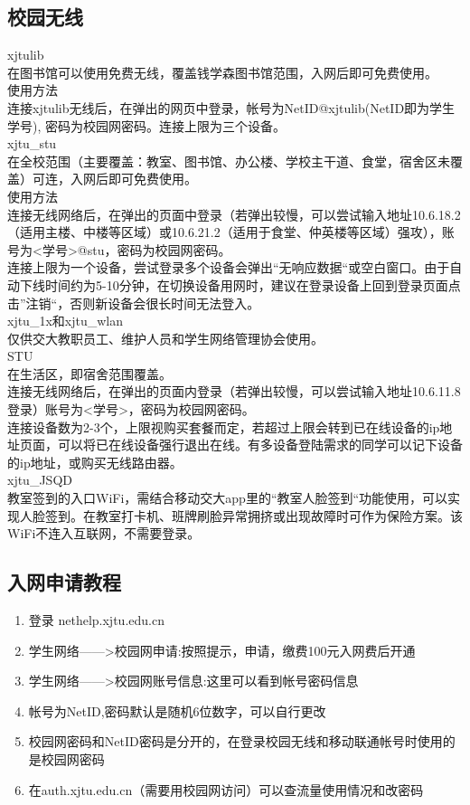 \documentclass[
decoration,  %
]{qyxf-book}
\begin{document}
\subsection{校园无线}
\noindent xjtulib\\
在图书馆可以使用免费无线，覆盖钱学森图书馆范围，入网后即可免费使用。\\
使用方法\\
连接xjtulib无线后，在弹出的网页中登录，帐号为NetID@xjtulib(NetID即为学生学号), 密码为校园网密码。连接上限为三个设备。\\
xjtu\_stu\\
在全校范围（主要覆盖：教室、图书馆、办公楼、学校主干道、食堂，宿舍区未覆盖）可连，入网后即可免费使用。\\
使用方法\\
连接无线网络后，在弹出的页面中登录（若弹出较慢，可以尝试输入地址10.6.18.2（适用主楼、中楼等区域）或10.6.21.2（适用于食堂、仲英楼等区域）强攻），账号为<学号>@stu，密码为校园网密码。\\
连接上限为一个设备，尝试登录多个设备会弹出“无响应数据“或空白窗口。由于自动下线时间约为5-10分钟，在切换设备用网时，建议在登录设备上回到登录页面点击”注销“，否则新设备会很长时间无法登入。\\
xjtu\_1x和xjtu\_wlan\\
仅供交大教职员工、维护人员和学生网络管理协会使用。\\
STU\\
在生活区，即宿舍范围覆盖。\\
连接无线网络后，在弹出的页面内登录（若弹出较慢，可以尝试输入地址10.6.11.8登录）账号为<学号>，密码为校园网密码。\\
连接设备数为2-3个，上限视购买套餐而定，若超过上限会转到已在线设备的ip地址页面，可以将已在线设备强行退出在线。有多设备登陆需求的同学可以记下设备的ip地址，或购买无线路由器。\\
xjtu\_JSQD\\
教室签到的入口WiFi，需结合移动交大app里的“教室人脸签到“功能使用，可以实现人脸签到。在教室打卡机、班牌刷脸异常拥挤或出现故障时可作为保险方案。该WiFi不连入互联网，不需要登录。\\


\subsection{入网申请教程}
\begin{enumerate}
	\item 登录 nethelp.xjtu.edu.cn
	\item 学生网络——>校园网申请:按照提示，申请，缴费100元入网费后开通
	\item 学生网络——>校园网账号信息:这里可以看到帐号密码信息
	\item 帐号为NetID,密码默认是随机6位数字，可以自行更改
	\item 校园网密码和NetID密码是分开的，在登录校园无线和移动联通帐号时使用的是校园网密码
	\item 在auth.xjtu.edu.cn（需要用校园网访问）可以查流量使用情况和改密码
\end{enumerate}
\end{document}
